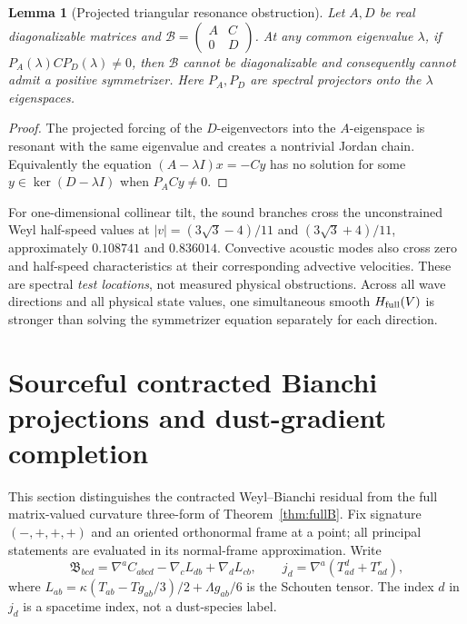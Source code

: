 \documentclass[11pt,a4paper]{article}
\newtheorem{lemma}[theorem]{Lemma}
\newcommand{\kap}{\kappa}
\begin{document}
\begin{lemma}[Projected triangular resonance obstruction]\label{lem:res}
Let $A,D$ be real diagonalizable matrices and $\mathcal B=\left(\begin{smallmatrix}A&C\\0&D\end{smallmatrix}\right)$. At any common eigenvalue $\lambda$, if $P_A(\lambda)C P_D(\lambda)\ne0$, then $\mathcal B$ cannot be diagonalizable and consequently cannot admit a positive symmetrizer. Here $P_A,P_D$ are spectral projectors onto the $\lambda$ eigenspaces.
\end{lemma}
\begin{proof}The projected forcing of the $D$-eigenvectors into the $A$-eigenspace is resonant with the same eigenvalue and creates a nontrivial Jordan chain. Equivalently the equation $(A-\lambda I)x=-Cy$ has no solution for some $y\in\ker(D-\lambda I)$ when $P_ACy\ne0$.\end{proof}
For one-dimensional collinear tilt, the sound branches cross the unconstrained Weyl half-speed values at $|v|=(3\sqrt3-4)/11$ and $(3\sqrt3+4)/11$, approximately $0.108741$ and $0.836014$. Convective acoustic modes also cross zero and half-speed characteristics at their corresponding advective velocities. These are spectral \emph{test locations}, not measured physical obstructions. Across all wave directions and all physical state values, one simultaneous smooth $H_{\rm full}(V)$ is stronger than solving the symmetrizer equation separately for each direction.


\section{Sourceful contracted Bianchi projections and dust-gradient completion}\label{sec:a10}
This section distinguishes the contracted Weyl--Bianchi residual from the full matrix-valued curvature three-form of Theorem~\ref{thm:fullB}. Fix signature $(-,+,+,+)$ and an oriented orthonormal frame at a point; all principal statements are evaluated in its normal-frame approximation. Write
\begin{equation}\label{eq:Bcontracted}
\mathfrak B_{bcd}=\nabla^aC_{abcd}-\nabla_cL_{db}+\nabla_dL_{cb},\qquad
j_d=\nabla^a(T^d_{ad}+T^r_{ad}),
\end{equation}
where $L_{ab}=\kap(T_{ab}-Tg_{ab}/3)/2+\Lambda g_{ab}/6$ is the Schouten tensor. The index $d$ in $j_d$ is a spacetime index, not a dust-species label.
\end{document}
